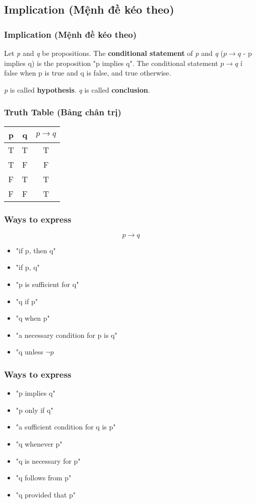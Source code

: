 \documentclass{beamer}
\begin{document}
\subsection{Implication (Mệnh đề kéo theo)}
\begin{frame}
    \frametitle{Implication (Mệnh đề kéo theo)}
    Let \textit{p} and \textit{q} be propositions. The \textbf{conditional statement} of \textit{p} and \textit{q} ($p \rightarrow q$ - p implies q) is the proposition "p implies q". The conditional statement $p \rightarrow q$ í false when p is true and q is false, and true otherwise.

    \textit{p} is called \textbf{hypothesis}. \textit{q} is called \textbf{conclusion}. 
\end{frame}
\begin{frame}
    \frametitle{Truth Table (Bảng chân trị)}
    \begin{center}
        \begin{tabular}{|c|c|c|}
            \hline
            p & q & $p \rightarrow q$\\
            \hline
            T & T & T \\
            \hline
            T & F & F \\
            \hline
            F & T & T \\
            \hline
            F & F & T \\
            \hline
        \end{tabular}
        \end{center}
        \end{frame}
\begin{frame}
    \frametitle{Ways to express}
    $$ p \rightarrow q$$
    \begin{itemize}
        \item "if p, then q"
        \item "if p, q"
        \item "p is sufficient for q"
        \item "q if p"
        \item "q when p"
        \item "a necessary condition for p is q"
        \item "q unless $\neg p$
        \end{itemize}
    \end{frame}
    \begin{frame}
        \frametitle{Ways to express}
        \begin{itemize}
            \item "p implies q"
            \item "p only if q"
            \item "a sufficient condition for q is p"
            \item "q whenever p"
            \item "q is necessary for p"
            \item "q follows from p"
            \item "q provided that p"
            \end{itemize}
        \end{frame}
\end{document}
